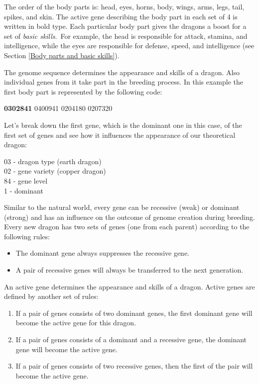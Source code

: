 \documentclass[12pt]{article}
\begin{document}
The order of the body parts is: head, eyes, horns, body, wings, arms, legs, tail, spikes, and skin. The active gene describing the body part in each set of 4 is written in bold type. Each particular body part gives the dragons a boost for a set of\textit{ basic skills}.\ For example, the head is responsible for attack, stamina, and intelligence, while the eyes are responsible for defense, speed, and intelligence (see Section \ref{Body parts and basic skills}).\par

The genome sequence determines the appearance and skills of a dragon. Also individual genes from it take part in the breeding process. In this example the first body part is represented by the following code:\par

\textbf{0302841} 0400941 0204180 0207320\par


\vspace{\baselineskip}

\begin{samepage}
Let's break down the first gene, which is the dominant one in this case, of the first set of genes and see how it influences the appearance of our theoretical dragon: 

03 - dragon type (earth dragon) \\
02 - gene variety (copper dragon) \\
84 - gene level \\
1 - dominant 
\end{samepage}

Similar to the natural world, every gene can be recessive (weak) or dominant (strong) and has an influence on the outcome of genome creation during breeding. Every new dragon has two sets of genes (one from each parent) according to the following rules:
\begin{itemize}
	\item The dominant gene always suppresses the recessive gene.
	\item A pair of recessive genes will always be transferred to the next generation.
\end{itemize}

An active gene determines the appearance and skills of a dragon. Active genes are defined by another set of rules:

\begin{enumerate}
	\item If a pair of genes consists of two dominant genes, the first dominant gene will become the active gene for this dragon.
	\item If a pair of genes consists of a dominant and a recessive gene, the dominant gene will become the active gene.
	\item If a pair of genes consists of two recessive genes, then the first of the pair will become the active gene.
\end{enumerate}
\end{document}
